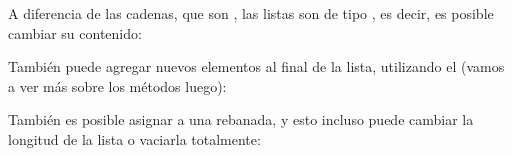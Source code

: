 \documentclass[a4,10pt,spanish]{sphinxmanual}
\begin{document}
\sphinxAtStartPar
A diferencia de las cadenas, que son {\hyperref[\detokenize{glossary:term-immutable}]{}}, las listas son de tipo {\hyperref[\detokenize{glossary:term-mutable}]{}}, es decir, es posible cambiar su contenido:

\begin{sphinxVerbatim}[commandchars=\\\{\}]
  \PYG{p}{[}    \PYG{p}{]}  
    
\PYG{p}{[}\PYG{p}{]}    
\end{sphinxVerbatim}

\sphinxAtStartPar
También puede agregar nuevos elementos al final de la lista, utilizando el   (vamos a ver más sobre los métodos luego):

\begin{sphinxVerbatim}[commandchars=\\\{\}]
  
    
\end{sphinxVerbatim}

\sphinxAtStartPar
También es posible asignar a una rebanada, y esto incluso puede cambiar la longitud de la lista o vaciarla totalmente:
\end{document}
